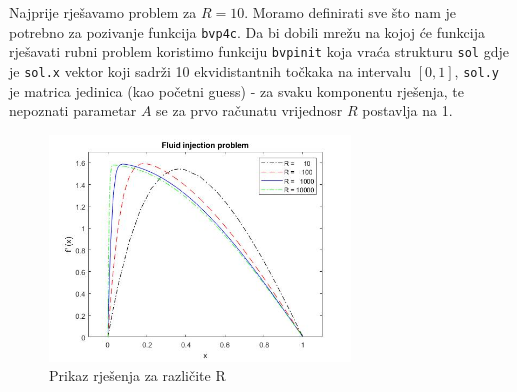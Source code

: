 \documentclass[a4paper]{article}
\newcommand{\code}[1]{\texttt{#1}}
\begin{document}
Najprije rješavamo problem za $R=10$. Moramo definirati sve što  nam je potrebno za pozivanje funkcija \code{bvp4c}.  Da bi dobili mrežu na kojoj će funkcija rješavati rubni problem koristimo funkciju \code{bvpinit} koja vraća strukturu \code{sol} gdje je \code{sol.x} vektor koji sadrži 10 ekvidistantnih točkaka na intervalu $[0,1]$, \code{sol.y} je matrica jedinica (kao početni guess) - za svaku komponentu rješenja, te nepoznati parametar $A$ se za prvo računatu vrijednosr $R$ postavlja na 1. 
 

\begin{figure}[!htbp]
\begin{center}
\includegraphics[width=8cm]{figure1.jpg}
\end{center}
\caption{Prikaz rješenja za različite R}
\end{figure}



\end{document}
